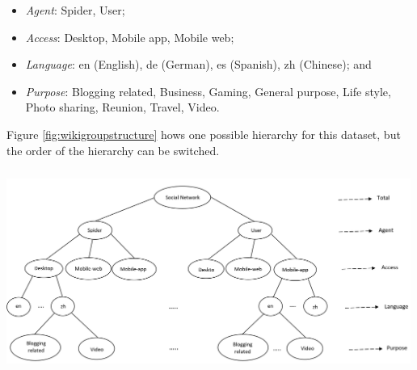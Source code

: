 \documentclass[11pt,a4paper,]{article}
\providecommand{\tightlist}{%
  \setlength{\itemsep}{0pt}\setlength{\parskip}{0pt}}
\let\origfigure\figure
\let\endorigfigure\endfigure
\renewenvironment{figure}[1][2] {
    \expandafter\origfigure\expandafter[!htbp]
} {
    \endorigfigure
}
\begin{document}
\begin{itemize}
\tightlist
\item
  \emph{Agent}: Spider, User;
\item
  \emph{Access}: Desktop, Mobile app, Mobile web;
\item
  \emph{Language}: en (English), de (German), es (Spanish), zh (Chinese); and
\item
  \emph{Purpose}: Blogging related, Business, Gaming, General purpose, Life style, Photo sharing, Reunion, Travel, Video.
\end{itemize}

Figure \ref{fig:wikigroupstructure} hows one possible hierarchy for this dataset, but the order of the hierarchy can be switched.

\begin{figure}

{\centering \includegraphics[width=500px,height=250px]{Paper-Figures/Wiki_group_structure} 

}

\caption{One possible hierarchical structure for the Wikipedia pageviews dataset.}\label{fig:wikigroupstructure}
\end{figure}
\end{document}
